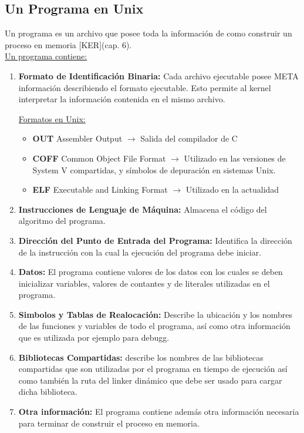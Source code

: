 \documentclass[../main.tex]{subfiles}
\begin{document}
    \subsection{Un Programa en Unix}
        Un programa es un archivo que posee toda la información de como construir un proceso en memoria [KER](cap. 6).\\

        \underline{Un programa contiene:}
        \begin{enumerate}
            \item \textbf{Formato de Identificación Binaria:} Cada archivo ejecutable posee META información describiendo el formato ejecutable. Esto permite al kernel interpretar la información contenida en el mismo archivo.
            
            \underline{Formatos en Unix:}
            \begin{itemize}
                \item \textbf{OUT} Assembler Output $\rightarrow$ Salida del compilador de C
                \item \textbf{COFF} Common Object File Format $\rightarrow$ Utilizado en las versiones de System V compartidas, y símbolos de depuración en sistemas Unix.
                \item \textbf{ELF} Executable and Linking Format $\rightarrow$ Utilizado en la actualidad
               
            \end{itemize}

            \item \textbf{Instrucciones de Lenguaje de Máquina:} Almacena el código del algoritmo del programa.
            \item \textbf{Dirección del Punto de Entrada del Programa:} Identifica la dirección de la instrucción con la cual la ejecución del programa debe iniciar.
            \item \textbf{Datos:} El programa contiene valores de los datos con los cuales se deben inicializar variables, valores de contantes y de literales utilizadas en el programa.
            \item \textbf{Simbolos y Tablas de Realocación:} Describe la ubicación y los nombres de las funciones y variables de todo el programa, así como otra información que es utilizada por ejemplo para debugg.
            \item \textbf{Bibliotecas Compartidas:} describe los nombres de las bibliotecas compartidas que son utilizadas por el programa en tiempo de ejecución así como también la ruta del linker dinámico que debe ser usado para cargar dicha biblioteca.
            \item \textbf{Otra información:} El programa contiene además otra información necesaria para terminar de construir el proceso en memoria.
        \end{enumerate}
       
\end{document}
